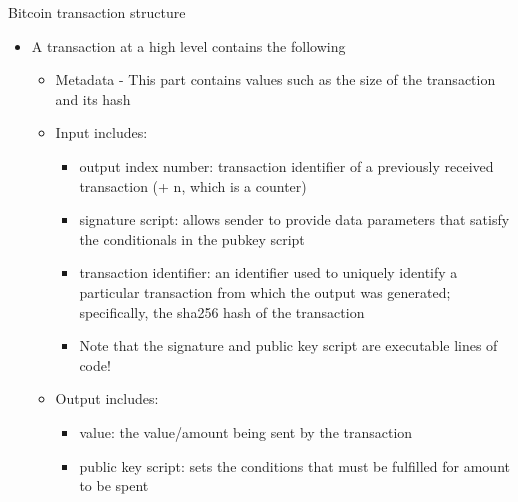 \documentclass[10pt]{beamer}
\begin{document}
\begin{frame}{Bitcoin transaction structure}
	\begin{itemize}
		\item A transaction at a high level contains the following
		\begin{itemize}
			\item Metadata - This part contains values such as the size of the transaction and its hash
			\item Input includes:
			\begin{itemize}
				\item output index number: transaction identifier of a previously received transaction (+ n, which is a counter)
				\item signature script: allows sender to provide data parameters that satisfy the conditionals in the pubkey script
				\item transaction identifier: an identifier used to uniquely identify a particular transaction from which the output was generated; specifically, the sha256 hash of the transaction
				\item Note that the signature and public key script are executable lines of code!
			\end{itemize}
			\item Output includes:
			\begin{itemize}
				\item value: the value/amount being sent by the transaction
				\item public key script: sets the conditions that must be fulfilled for amount to be spent
			\end{itemize}
		\end{itemize}
	\end{itemize}
\end{frame}


\end{document}
